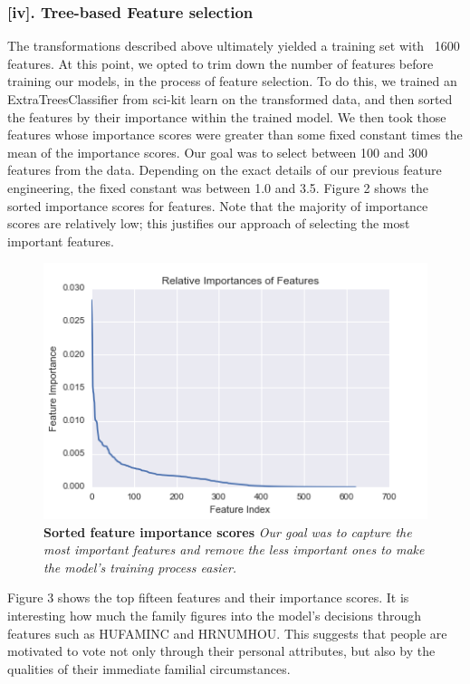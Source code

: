 \subsubsection*{[iv]. Tree-based Feature selection}
The transformations described above ultimately yielded a training set with ~1600 features. At this point, we opted to trim down the number of features before training our models, in the process of feature selection. To do this, we trained an ExtraTreesClassifier from sci-kit learn on the transformed data, and then sorted the features by their importance within the trained model. We then took those features whose importance scores were greater than some fixed constant times the mean of the importance scores. Our goal was to select between 100 and 300 features from the data. Depending on the exact details of our previous feature engineering, the fixed constant was between 1.0 and 3.5. Figure 2 shows the sorted importance scores for features. Note that the majority of importance scores are relatively low; this justifies our approach of selecting the most important features.

\begin{figure}[h]
\center
\includegraphics[scale=0.65]{figure5/feature_importances.png}
\caption{\textbf{Sorted feature importance scores}
\textit{Our goal was to capture the most important features and remove the less important ones to make the model's training process easier.}}
\end{figure}

Figure 3 shows the top fifteen features and their importance scores. It is interesting how much the family figures into the model's decisions through features such as HUFAMINC and HRNUMHOU. This suggests that people are motivated to vote not only through their personal attributes, but also by the qualities of their immediate familial circumstances.

